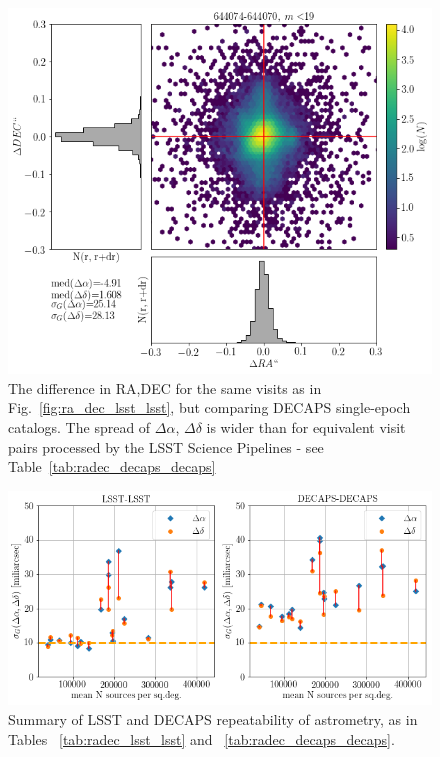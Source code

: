 \documentclass[DM,lsstdraft,toc,usenatbib]{lsstdoc}
\begin{document}
\begin{figure}
\begin{centering}
\includegraphics[width=0.8\columnwidth]{figs/decaps644074-644070_RA_DEC_offset_lims.png}
\caption{The difference in RA,DEC for  the same visits as in Fig.~\ref{fig:ra_dec_lsst_lsst}, but comparing DECAPS single-epoch catalogs. The spread of  $\Delta \alpha$, $\Delta \delta$ is wider than for equivalent visit pairs processed by the LSST Science Pipelines - see Table~\ref{tab:radec_decaps_decaps}}
\label{fig:ra_dec_decaps_decaps}
\end{centering}
\end{figure} 




\begin{figure}
\begin{centering}
\includegraphics[width=0.8\columnwidth]{figs/Astrometry_LSST-LSST_DECAPS-DECAPS.png}
\caption{Summary of LSST and DECAPS repeatability of astrometry, as in Tables ~\ref{tab:radec_lsst_lsst} and ~\ref{tab:radec_decaps_decaps}.}
\label{fig:lsst_decaps_side}
\end{centering}
\end{figure} 
\end{document}

